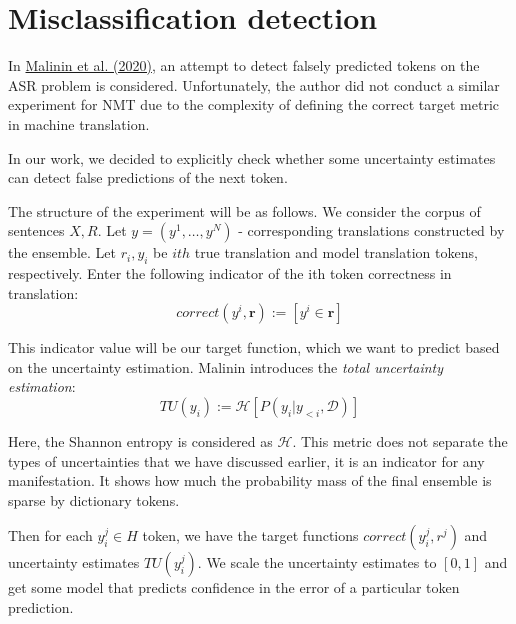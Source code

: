 \documentclass[a4paper,14pt]{extarticle}
\newcommand{\bibref}[3]{\hyperlink{#1}{#2 (#3)}}
\begin{document}
\section{Misclassification detection}
	In \bibref{uncertainty}{Malinin et al.} {2020}, an attempt to detect falsely predicted tokens on the ASR problem is considered. Unfortunately, the author did not conduct a similar experiment for NMT due to the complexity of defining the correct target metric in machine translation.

	In our work, we decided to explicitly check whether some uncertainty estimates can detect false predictions of the next token.

	The structure of the experiment will be as follows. We consider the corpus of sentences $X, R$. Let $y = (y^1, \dots, y^N)$ - corresponding translations constructed by the ensemble. Let $r_{i}, y_{i}$ be $ith$  true translation and model translation tokens, respectively. Enter the following indicator of the ith token correctness in translation:
	\begin{equation}
		correct(y^{i}, \textbf{r}) := [y^{i} \in \textbf{r}]
	\end{equation}
	
	This indicator value will be our target function, which we want to predict based on the uncertainty estimation. Malinin introduces the \textit{total uncertainty estimation}:
	\begin{equation}
		TU(y_i) := \mathcal{H}[P(y_i|y_{<i}, \mathcal{D})]
	\end{equation}
	
	Here, the Shannon entropy is considered as $\mathcal{H}$. This metric does not separate the types of uncertainties that we have discussed earlier, it is an indicator for any manifestation. It shows how much the probability mass of the final ensemble is sparse by dictionary tokens.

	Then for each $y_i^j \in H$ token, we have the target functions $correct(y_i^j, r^j)$ and uncertainty estimates $TU (y_i^j)$. We scale the uncertainty estimates to $[0, 1]$ and get some model that predicts confidence in the error of a particular token prediction.
	
\end{document}

